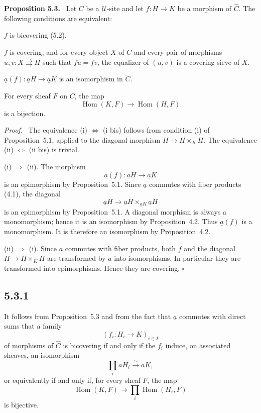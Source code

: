 \documentclass[11pt]{article}
\newcommand{\U}{\mathcal{U}}
\newcommand{\Hom}{\operatorname{Hom}}
\newcommand{\qedtext}{\hfill\(\square\)}
\newenvironment{statement}[1]{\par\medskip\noindent\textbf{#1.}\ }{\par\medskip}
\newenvironment{prooftext}{\par\noindent\emph{Proof.}\ }{\par\medskip}
\begin{document}
\begin{statement}{Proposition 5.3}
Let \(C\) be a \(\U\)-site and let \(f:H\to K\) be a morphism of \(\widehat C\). The following conditions are equivalent:
\begin{description}[leftmargin=2.9em]
\item[(i)] \(f\) is bicov\-ering (5.2).
\item[(i bis)] \(f\) is covering, and for every object \(X\) of \(C\) and every pair of morphisms \(u,v:X\rightrightarrows H\) such that \(fu=fv\), the equalizer of \((u,v)\) is a covering sieve of \(X\).
\item[(ii)] \(\underline a(f):\underline aH\to\underline aK\) is an isomorphism in \(\widetilde C\).
\item[(ii bis)] For every sheaf \(F\) on \(C\), the map
\[
\Hom(K,F)\to \Hom(H,F)
\]
is a bijection.
\end{description}
\end{statement}

\begin{prooftext}
The equivalence (i) \(\Leftrightarrow\) (i bis) follows from condition (i) of Proposition~5.1, applied to the diagonal morphism \(H\to H\times_KH\). The equivalence (ii) \(\Leftrightarrow\) (ii bis) is trivial.

(i) \(\Rightarrow\) (ii). The morphism
\[
\underline a(f):\underline aH\to \underline aK
\]
is an epimorphism by Proposition~5.1. Since \(\underline a\) commutes with fiber products (4.1), the diagonal
\[
\underline aH\to \underline aH\times_{\underline aK}\underline aH
\]
is an epimorphism by Proposition~5.1. A diagonal morphism is always a monomorphism; hence it is an isomorphism by Proposition~4.2. Thus \(\underline a(f)\) is a monomorphism. It is therefore an isomorphism by Proposition~4.2.

(ii) \(\Rightarrow\) (i). Since \(\underline a\) commutes with fiber products, both \(f\) and the diagonal \(H\to H\times_KH\) are transformed by \(\underline a\) into isomorphisms. In particular they are transformed into epimorphisms. Hence they are covering. \qedtext
\end{prooftext}

\subsection*{5.3.1}
It follows from Proposition~5.3 and from the fact that \(\underline a\) commutes with direct sums that a family
\[
(f_i:H_i\to K)_{i\in I}
\]
of morphisms of \(\widehat C\) is bicov\-ering if and only if the \(f_i\) induce, on associated sheaves, an isomorphism
\[
\coprod_i\underline aH_i\xrightarrow{\sim}\underline aK,
\]
or equivalently if and only if, for every sheaf \(F\), the map
\[
\Hom(K,F)\longrightarrow \prod_i\Hom(H_i,F)
\]
is bijective.
\end{document}
